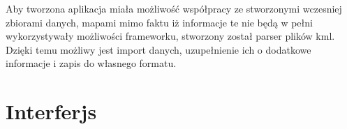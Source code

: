 Aby tworzona aplikacja miała możliwość współpracy ze stworzonymi wczesniej zbiorami danych, mapami mimo faktu iż informacje te nie będą w pełni wykorzystywały możliwości frameworku, stworzony został parser plików kml. Dzięki temu możliwy jest import danych, uzupełnienie ich o dodatkowe informacje i zapis do własnego formatu.



\section{Interferjs}
\label{sec:Interferjs}


